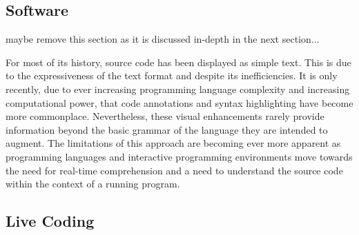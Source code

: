 \subsection{Software}
{\color{red} maybe remove this section as it is discussed in-depth in the next section...}

For most of its history, source code has been displayed as simple text. This is due to the expressiveness of the text format and despite its inefficiencies. It is only recently, due to ever increasing programming language complexity and increasing computational power, that code annotations and syntax highlighting have become more commonplace. Nevertheless, these visual enhancements rarely provide information beyond the basic grammar of the language they are intended to augment. The limitations of this approach are becoming ever more apparent as programming languages and interactive programming environments move towards the need for real-time comprehension and a need to understand the source code within the context of a running program.








\subsection{Live Coding}

